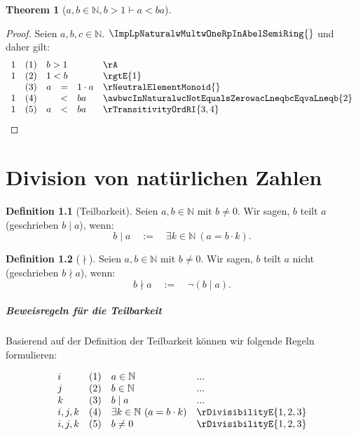 \documentclass{book}
\theoremstyle{plain}
\newtheorem{theorem}{Theorem}
\theoremstyle{remark}
\theoremstyle{definition}
\newtheorem{definition}{Definition}[section]
\begin{document}
\label{awbInNaturalwbGneqOneImpaLneqba}
\begin{theorem}[\(a,b\in\mathbb{N},b>1\vdash a<ba\)]
\end{theorem}
\begin{proof}
Seien \(a,b,c\in\mathbb{N}\). \(\ImpLpNaturalwMultwOneRpInAbelSemiRing{}\) und daher gilt:
       \[
	\begin{array}{lllcll}
            1       &  (1)  & \multicolumn{3}{l}{b>1} & \rA \\
            1       &  (2)  & \multicolumn{3}{l}{1<b} & \rgtE{1} \\
                    &  (3)  & a&=&1\cdot a & \rNeutralElementMonoid{} \\
            1       &  (4)  &  &<&ba & \awbwcInNaturalwcNotEqualsZerowacLneqbcEqvaLneqb{2} \\
            1       &  (5)  &  a&<&ba & \rTransitivityOrdRI{3,4} \\
	\end{array}
        \]
\end{proof}


\chapter{Division von natürlichen Zahlen}

\begin{definition}[Teilbarkeit]
Seien \( a, b \in \mathbb{N} \) mit \( b \neq 0 \). Wir sagen, \( b \) teilt \( a \) (geschrieben \( b \mid a \)), wenn:
\[
b \mid a \quad := \quad \exists k \in \mathbb{N} \ (a = b \cdot k).
\]
\end{definition}

\begin{definition}[\(\nmid\)]
Seien \( a, b \in \mathbb{N} \) mit \( b \neq 0 \). Wir sagen, \( b \) teilt \( a \) nicht (geschrieben \( b \nmid a \)), wenn:
\[
b \nmid a \quad := \quad \neg(b \mid a).
\]
\end{definition}

\paragraph{Beweisregeln für die Teilbarkeit}
\label{rule:rDivisibilityI} \label{rule:rDivisibilityE}
Basierend auf der Definition der Teilbarkeit können wir folgende Regeln formulieren:

\[
\begin{array}{llll}
    i & (1) & a \in \mathbb{N} & ... \\
    j & (2) & b \in \mathbb{N} & ... \\
    k & (3) & b \mid a & ... \\
    i,j,k & (4) & \exists k \in \mathbb{N} \ (a = b \cdot k) & \rDivisibilityE{1,2,3} \\
    i,j,k & (5) & b\neq 0 & \rDivisibilityE{1,2,3} \\
\end{array}
\]
\end{document}
